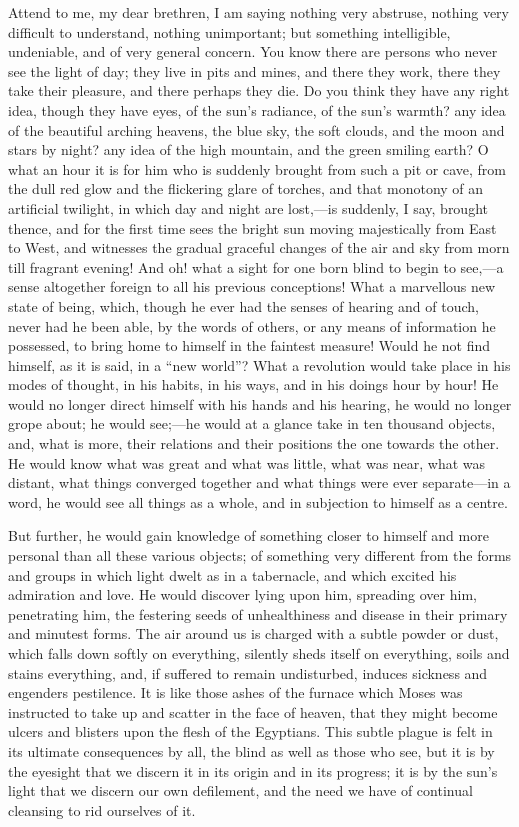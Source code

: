 Attend to me, my dear brethren, I am saying nothing very abstruse,
nothing very difficult to understand, nothing unimportant; but
something intelligible, undeniable, and of very general concern. You
know there are persons who never see the light of day; they live in
pits and mines, and there they work, there they take their pleasure,
and there perhaps they die. Do you think they have any right idea,
though they have eyes, of the sun's radiance, of the sun's warmth? any
idea of the beautiful arching heavens, the blue sky, the soft clouds,
and the moon and stars by night? any idea of the high mountain, and
the green smiling earth? O what an hour it is for him who is suddenly
brought from such a pit or cave, from the dull red glow and the
flickering glare of torches, and that monotony of an artificial
twilight, in which day and night are lost,—is suddenly, I say,
brought thence, and for the first time sees the bright sun moving
majestically from East to West, and witnesses the gradual graceful
changes of the air and sky from morn till fragrant evening! And oh!
what a sight for one born blind to begin to see,—a sense altogether
foreign to all his previous conceptions! What a marvellous new state
of being, which, though he ever had the senses of hearing and of
touch, never had he been able, by the words of others, or any means of
information he possessed, to bring home to himself in the faintest
measure! Would he not find himself, as it is said, in a ``new
world''? What a revolution would take place in his modes of
thought, in his habits, in his ways, and in his doings hour by hour!
He would no longer direct himself with his hands and his hearing, he
would no longer grope about; he would see;—he would at a glance take
in ten thousand objects, and, what is more, their relations and their
positions the one towards the other. He would know what was great and
what was little, what was near, what was distant, what things
converged together and what things were ever separate—in a word, he
would see all things as a whole, and in subjection to himself as a
centre.

But further, he would gain knowledge of something closer to himself
and more personal than all these various objects; of something very
different from the forms and groups in which light dwelt as in a
tabernacle, and which excited his admiration and love. He would
discover lying upon him, spreading over him, penetrating him, the
festering seeds of unhealthiness and disease in their primary and
minutest forms. The air around us is charged with a subtle powder or
dust, which falls down softly on everything, silently sheds itself on
everything, soils and stains everything, and, if suffered to remain
undisturbed, induces sickness and engenders pestilence. It is like
those ashes of the furnace which Moses was instructed to take up and
scatter in the face of heaven, that they might become ulcers and
blisters upon the flesh of the Egyptians. This subtle plague is felt
in its ultimate consequences by all, the blind as well as those who
see, but it is by the eyesight that we discern it in its origin and in
its progress; it is by the sun's light that we discern our own
defilement, and the need we have of continual cleansing to rid
ourselves of it.

